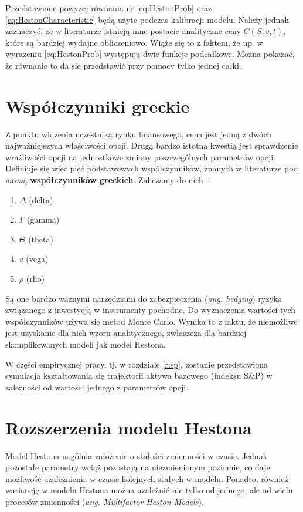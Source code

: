 \documentclass{pracamgr}
\begin{document}
Przedstawione powyżej równania nr \ref{eq:HestonProb} oraz 
\ref{eq:HestonCharacteristic} będą użyte podczas kalibracji modelu. Należy jednak zaznaczyć, że 
w literaturze istnieją inne postacie analityczne ceny $C(S, v, t)$, które są bardziej wydajne 
obliczeniowo. 
Wiąże się to z faktem, że np. w wyrażeniu \ref{eq:HestonProb} występują dwie funkcje podcałkowe. 
Można pokazać, że równanie to da się przedstawić przy pomocy tylko jednej całki.

\section{Współczynniki greckie}

Z punktu widzenia uczestnika rynku finansowego, cena jest jedną z dwóch najważniejszych 
właściwości opcji. Drugą bardzo istotną kwestią jest sprawdzenie wrażliwości opcji na jednostkowe 
zmiany poszczególnych parametrów opcji.
Definiuje się więc pięć podstawowych współczynników, znanych w literaturze pod 
nazwą \textbf{współczynników greckich}.
Zaliczamy do nich \cite{Hull}:
\begin{enumerate}
  \item $\Delta$ (delta)
  \item $\Gamma$ (gamma)
  \item $\Theta$ (theta)
  \item $v$ (vega)
  \item $\rho$ (rho)
\end{enumerate}
Są one bardzo ważnymi narzędziami do zabezpieczenia (\textit{ang. hedging}) ryzyka 
związanego z inwestycją w instrumenty pochodne.
Do wyznaczenia wartości tych współczynników używa się metod Monte Carlo. Wynika to z faktu, 
że niemożliwe jest uzyskanie dla nich wzoru analitycznego, 
zwłaszcza dla bardziej skomplikowanych modeli jak model Hestona.

W części empirycznej pracy, tj. w rozdziale \ref{r:sp}, zostanie przedstawiona symulacja 
kształtowania się trajektorii aktywa bazowego (indeksu S\&P) w zależności od wartości jednego z 
parametrów opcji.

\section{Rozszerzenia modelu Hestona}

Model Hestona uogólnia założenie o stałości zmienności w czasie. 
Jednak pozostałe parametry wciąż pozostają na niezmienionym poziomie, 
co daje możliwość uzależnienia w czasie kolejnych stałych w modelu.
Ponadto, również wariancję w modelu Hestona można uzależnić nie tylko 
od jednego, ale od wielu procesów zmienności (\textit{ang. Multifactor Heston Models}).
\end{document}

